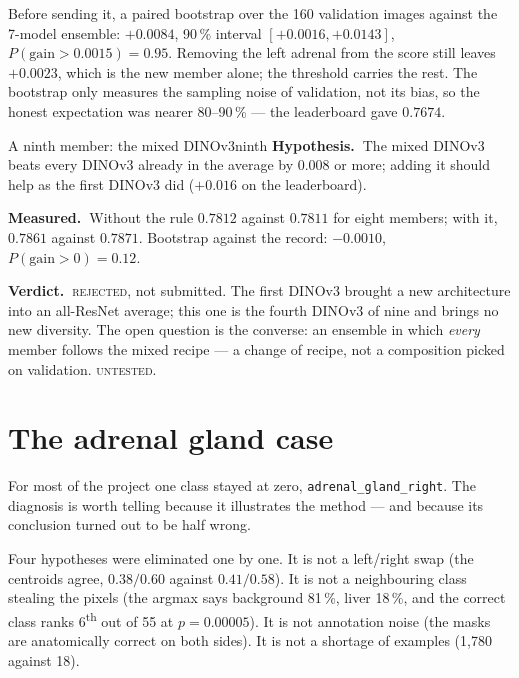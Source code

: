 \documentclass{article}
\newcommand{\hyp}{\textbf{Hypothesis.\ }}
\newcommand{\meas}{\textbf{Measured.\ }}
\newcommand{\verd}{\textbf{Verdict.\ }}
\newcommand{\rejected}{\textcolor{myred}{\textsc{rejected}}}
\newcommand{\untested}{\textcolor{slate}{\textsc{untested}}}
\begin{document}
\vspace{2.0mm}

\noindent Before sending it, a paired bootstrap over the 160 validation images
against the 7-model ensemble: $+0.0084$, 90\,\% interval $[+0.0016, +0.0143]$,
$P(\text{gain} > 0.0015) = 0.95$. Removing the left adrenal from the score still
leaves $+0.0023$, which is the new member alone; the threshold carries the rest.
The bootstrap only measures the sampling noise of validation, not its bias, so
the honest expectation was nearer 80--90\,\% --- the leaderboard gave
$\mathbf{0.7674}$.

\begin{expfail}{A ninth member: the mixed DINOv3}{ninth}
\hyp The mixed DINOv3 beats every DINOv3 already in the average by $0.008$ or
more; adding it should help as the first DINOv3 did ($+0.016$ on the
leaderboard).

\meas Without the rule $0.7812$ against $0.7811$ for eight members; with it,
$0.7861$ against $0.7871$. Bootstrap against the record: $-0.0010$,
$P(\text{gain} > 0) = 0.12$.

\verd \rejected, not submitted. The first DINOv3 brought a new architecture into
an all-ResNet average; this one is the fourth DINOv3 of nine and brings no new
diversity. The open question is the converse: an ensemble in which \emph{every}
member follows the mixed recipe --- a change of recipe, not a composition picked
on validation. \untested.
\end{expfail}

\newpage

\section{The adrenal gland case}
\label{sec:adrenal}

For most of the project one class stayed at zero, \texttt{adrenal\_gland\_right}.
The diagnosis is worth telling because it illustrates the method --- and because
its conclusion turned out to be half wrong.

\vspace{2.0mm}
\noindent Four hypotheses were eliminated one by one. It is not a left/right swap (the
centroids agree, $0.38/0.60$ against $0.41/0.58$). It is not a neighbouring class
stealing the pixels (the argmax says background 81\,\%, liver 18\,\%, and the
correct class ranks 6\textsuperscript{th} out of 55 at $p = 0.00005$). It is not
annotation noise (the masks are anatomically correct on both sides). It is not a
shortage of examples (1{,}780 against 18).
\end{document}
